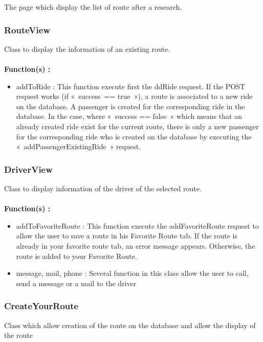 The page which display the list of route after a research.

\subsubsection{RouteView}

Class to display the information of an existing route.
\\\\
\textbf{Function(s) :}

\begin{itemize}
\item addToRide : This function execute first the ddRide request. If the POST request works (if « success == true »), a route is associated to a new ride on the database. A passenger is created for the corresponding ride in the database. In the case, where « success == false » which means that an already created ride exist for the current route, there is only a new passenger for the corresponding ride who is created on the database by executing the « addPassengerExistingRide » request.
\end{itemize}

\subsubsection{DriverView}

Class to display information of the driver of the selected route.
\\\\
\textbf{Function(s) :}

\begin{itemize}
\item addToFavoriteRoute : This function execute the addFavoriteRoute request to allow the user to save a route in his Favorite Route tab. If the route is already in your favorite route tab, an error message appears. Otherwise, the route is added to your Favorite Route.	

\item message, mail, phone : Several function in this class allow the user to call, send a message or a mail to the driver
\end{itemize}

\subsubsection{CreateYourRoute}

Class which allow creation of the route on the database and allow the display of the route

